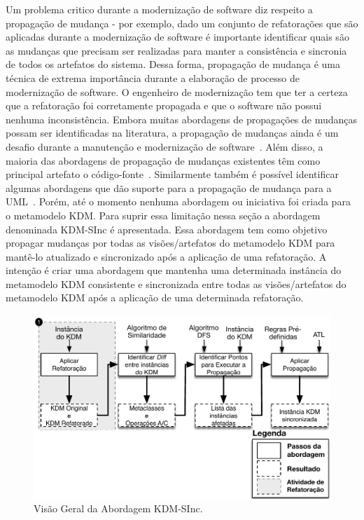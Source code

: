 Um problema critico durante a modernização de software diz respeito a propagação de mudança - por exemplo,  dado um conjunto de refatorações que são aplicadas durante a modernização de software é importante identificar quais são as mudanças que precisam ser realizadas para manter a consistência e sincronia de todos os artefatos do sistema. Dessa forma, propagação de mudança é uma técnica de extrema importância durante a elaboração de processo de modernização de software. O engenheiro de modernização tem que ter a certeza que a refatoração foi corretamente propagada e que o software não possui nenhuma inconsistência. Embora muitas abordagens de propagações de mudanças possam ser identificadas na literatura, a propagação de mudanças ainda é um desafio durante a manutenção e modernização de software~\cite{Tom_2008_roadmap}. Além disso, a maioria das abordagens de propagação de mudanças existentes têm como principal artefato o código-fonte~\cite{Vaclav_methodology, Deursen07model_drivensoftware}. Similarmente também é possível identificar algumas abordagens que dão suporte para a propagação de mudança para a UML~\cite{Egyed_2008,Liu02rule, Briand_2006}. Porém, até o momento nenhuma abordagem ou iniciativa foi criada para o metamodelo KDM. Para suprir essa limitação nessa seção a abordagem denominada KDM-SInc é apresentada. Essa abordagem tem como objetivo propagar mudanças por todas as visões/artefatos do metamodelo KDM para mantê-lo atualizado e sincronizado após a aplicação de uma refatoração. A intenção é criar uma abordagem que mantenha uma determinada instância do metamodelo KDM consistente e sincronizada entre todas as visões/artefatos do metamodelo KDM após a aplicação de uma determinada refatoração. 

\begin{figure}[h]
	\centering
	\caption{Visão Geral da Abordagem KDM-SInc.}
	\label{fig:kdm_sinc}
	\includegraphics[scale=0.65]{images/AbordagemKDM_SInc}
	\fautor
\end{figure}


